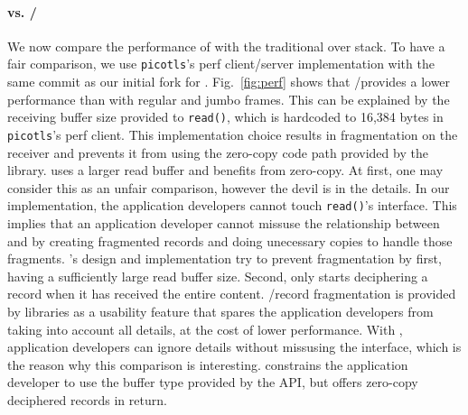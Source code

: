 \paragraph*{\tcpls vs. \tls/\tcp} We now compare the performance of \tcpls with
the traditional \tls over \tcp stack. To have a fair comparison, we use
\texttt{picotls}'s perf client/server
implementation with the same commit as our initial fork for \tcpls.
Fig.~\ref{fig:perf} shows that \tls/\tcp provides a lower performance than
\tcpls with regular and jumbo frames. This can be explained by the receiving
buffer size provided to \texttt{read()}, which is hardcoded to 16,384 bytes
in \texttt{picotls}'s perf client. This implementation choice
results in fragmentation on the
receiver and prevents it from using the zero-copy code path provided by the
library. \tcpls uses a larger read buffer and benefits from zero-copy. At first,
one may consider this as an unfair comparison, however the devil is in the
details. In our \tcpls implementation, the application developers cannot touch
\texttt{read()}'s interface. This implies that an application developer cannot
missuse the relationship between \tls and \tcp by creating fragmented records
and doing unecessary copies to handle those fragments. \tcpls's design and
implementation try to prevent fragmentation by first, having a sufficiently
large read buffer size. Second, \tcpls only starts deciphering a record when it has
received the entire content. \tls/\tcp record fragmentation is provided by \tls
libraries as a usability feature that spares the application developers from
taking into account all \tls details, at the cost of lower performance. With
\tcpls, application developers can ignore \tls details without missusing the
interface, which is the reason why this comparison is interesting.\tcpls
constrains the application developer to use the buffer type provided by the API,
but offers zero-copy deciphered records in return.


